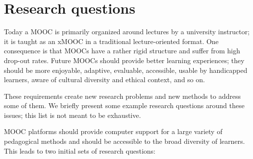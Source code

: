 \section{Research questions}
Today a MOOC  is primarily organized around lectures by a university instructor; it is taught as an
xMOOC in a traditional lecture-oriented format. One consequence is that MOOCs have a rather rigid
structure and suffer from high drop-out rates.  Future MOOCs should provide better learning
experiences; they should be more enjoyable, adaptive, evaluable, accessible, usable by handicapped
learners, aware of cultural diversity and ethical context, and so on.

These requirements create new research problems and new methods to address some of them. We briefly present some example research questions around these issues; this list is not meant to be exhaustive.  

\medskip
MOOC platforms should provide computer support for a large variety of pedagogical methods and should be accessible to the broad diversity of learners. This leads to two initial sets of research questions:
 
